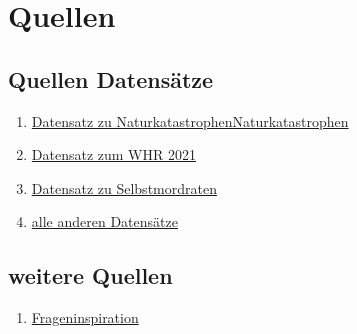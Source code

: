 \documentclass[12pt]{article}
\begin{document}
	\section{Quellen}
	
	\subsection{Quellen Datensätze}
	
	\begin{enumerate}
		\item \href{https://www.kaggle.com/datasets/brsdincer/all-natural-disasters-19002021-eosdis/code}{Datensatz zu NaturkatastrophenNaturkatastrophen}
		\item \href{https://www.kaggle.com/datasets/ajaypalsinghlo/world-happiness-report-2021}{Datensatz zum WHR 2021}
		\item \href{https://apps.who.int/gho/data/node.imr.MH_12?lang=en}{Datensatz zu Selbstmordraten}
		\item \href{https://data.un.org/}{alle anderen Datensätze}
	\end{enumerate}
	
	\subsection{weitere Quellen}
	\begin{enumerate}
	\item \href{https://www.gapminder.org/}{Frageninspiration}
		
	\end{enumerate}
	
\end{document}
